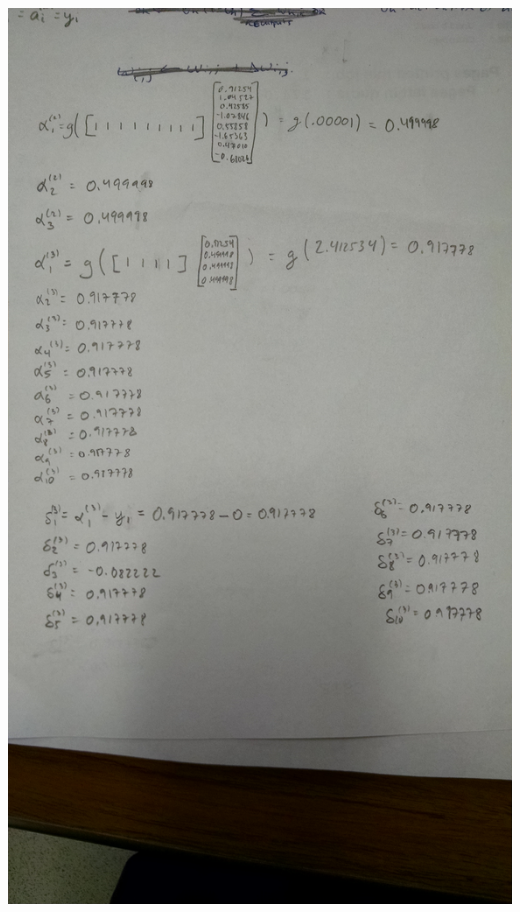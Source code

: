 \documentclass[10pt]{article}
\begin{document}
\begin{flushleft}
\includegraphics[width=\linewidth,height=\textheight]{./hand1.jpg}


\end{flushleft}
\end{document}
